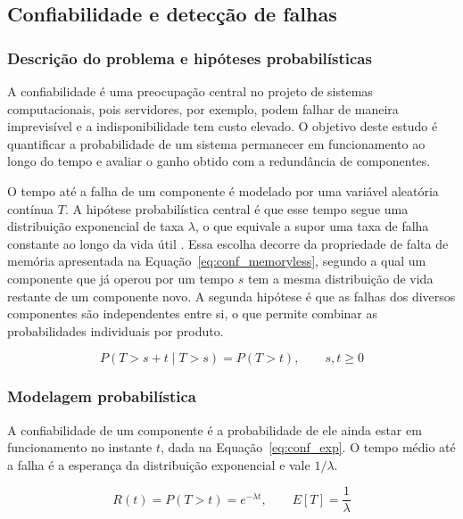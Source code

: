 \subsection{Confiabilidade e detecção de falhas}

\subsubsection{Descrição do problema e hipóteses probabilísticas}

A confiabilidade é uma preocupação central no projeto de sistemas
computacionais, pois servidores, por exemplo, podem falhar de maneira imprevisível
e a indisponibilidade tem custo elevado. O objetivo deste estudo é quantificar a
probabilidade de um sistema permanecer em funcionamento ao longo do tempo e
avaliar o ganho obtido com a redundância de componentes.

O tempo até a falha de um componente é modelado por uma variável aleatória
contínua $T$. A hipótese probabilística central é que esse tempo segue uma
distribuição exponencial de taxa $\lambda$, o que equivale a supor uma taxa de
falha constante ao longo da vida útil \cite{harcholbalter2024probability}. Essa
escolha decorre da propriedade de falta de memória apresentada na
Equação~\ref{eq:conf_memoryless}, segundo a qual
um componente que já operou por um tempo $s$ tem a mesma distribuição de vida
restante de um componente novo. A segunda hipótese é que as falhas dos diversos
componentes são independentes entre si, o que permite combinar as probabilidades
individuais por produto.

\begin{equation}
	P(T > s + t \mid T > s) = P(T > t), \qquad s, t \ge 0
	\label{eq:conf_memoryless}
\end{equation}

\subsubsection{Modelagem probabilística}

A confiabilidade de um componente é a probabilidade de ele ainda estar em
funcionamento no instante $t$, dada na Equação~\ref{eq:conf_exp}. O tempo médio
até a falha é a esperança da distribuição exponencial e vale
$1/\lambda$.

\begin{equation}
	R(t) = P(T > t) = e^{-\lambda t}, \qquad E[T] = \frac{1}{\lambda}
	\label{eq:conf_exp}
\end{equation}

